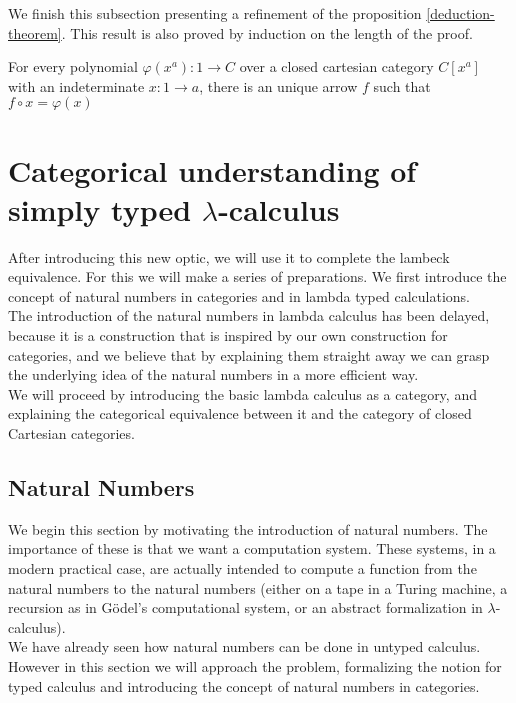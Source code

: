 We finish this subsection presenting a refinement of the proposition \ref{deduction-theorem}. This result is also proved by induction on the length of the proof.

\begin{proposition}
  For every polynomial $\varphi(x^a): 1\to C$ over a closed cartesian category $C[x^a]$ with an indeterminate $x:1\to a$, there is an unique arrow $f$ such that $f\circ x=\varphi(x)$
\end{proposition}

\section{Categorical understanding of simply typed $\lambda$-calculus}
After introducing this new optic, we will use it to complete the lambeck equivalence. For this we will make a series of preparations. We first introduce the concept of natural numbers in categories and in lambda typed calculations.\\

The introduction of the natural numbers in lambda calculus has been delayed, because it is a construction that is inspired by our own construction for categories, and we believe that by explaining them straight away we can grasp the underlying idea of the natural numbers in a more efficient way.\\

We will proceed by introducing the basic lambda calculus as a category, and explaining the categorical equivalence between it and the category of closed Cartesian categories.

\subsection{Natural Numbers}


We begin this section by motivating the introduction of natural numbers. The importance of these is that we want a computation system. These systems, in a modern practical case, are actually intended to compute a function from the natural numbers to the natural numbers (either on a tape in a Turing machine, a recursion as in Gödel's computational system, or an abstract formalization in $\lambda$-calculus).\\

We have already seen how natural numbers can be done in untyped calculus. However in this section we will approach the problem, formalizing the notion for typed calculus and introducing the concept of natural numbers in categories.

